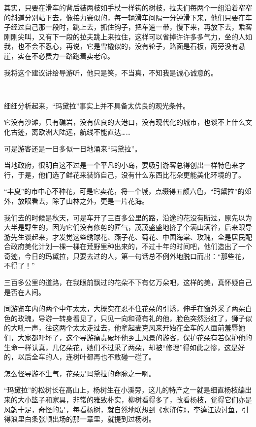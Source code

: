 \par 其实，只要在滑车的背后装两枝如手杖一样钩的树枝，拉夫们每两个一组沿着窄窄的斜道分别站下去，像接力赛似的，每一辆滑车间隔一分钟滑下来，他们只要在车子经过自己那一段时，跳上去，抓住钩子，把车速一带，慢下来，再放下去，乘客刚刚尖叫，又有下一段的拉夫跳上来拉住，这样可以省掉许许多多气力，坐的人如我，也不会不忍心，再说，它是雪橇似的，没有轮子，路面是石板，两旁没有悬崖，实在不必费力一路跑着卖老命。
\par 我将这个建议讲给导游听，他只是笑，不当真，不知我是诚心诚意的。
\par  
\par 细细分析起来，“玛黛拉”事实上并不具备太优良的观光条件。
\par 它没有沙滩，只有礁岩，没有优良的大港口，没有现代化的城市，也谈不上什么文化古迹，离欧洲大陆远，航线不能直达……
\par 可是游客还是一日多似一日地涌来“玛黛拉”。
\par 当地政府，很明白这不过是一个平凡的小岛，要吸引游客总得创出一样特色来才行，于是，他们选了鲜花来装饰自己，没有什么东西比花朵更能美化环境的了。
\par “丰夏”的市中心不种花，可是它卖花，将一个城，点缀得五颜六色，“玛黛拉”的郊外，放眼看去，除了山林之外，更是一片花海。
\par 我们去的时候是秋天，可是车开了三百多公里的路，沿途的花没有断过，原先以为大半是野生的，因为它们没有修剪的匠气，茂茂盛盛地挤了个满山满谷，后来跟导游先生谈起来，才发觉这些绣球花、燕子花、菊花、中国海棠、玫瑰，全是居民配合政府美化计划一棵一棵在荒野里种出来的，不过十年的时间吧，他们造出了一个奇迹，今日的玛黛拉，只要去过的人，第一句话总不例外地脱口而出：“那些花，不得了！”
\par 三百多公里的道路，在我眼前飘过的花朵不下有亿万朵吧，这样的美，真怀疑自己是否在人间。
\par 同游览车内的两个中年太太，大概实在忍不住花朵的引诱，伸手在窗外采了两朵白色的玫瑰，导游一转身看见了，只见一向和蔼有礼的他，脸色突然涨红了，狮子似的大吼一声，往这两个太太走过去，他拿起麦克风来开始在全车的人面前羞辱她们，大家都吓坏了，这个导游痛责破坏他乡土风景的游客，保护花朵有若保护他的生命一样认真，几亿朵花，她们不过采了两朵，却被“修理”得如此之惨，这是好的，以后全车的人，连树叶都再也不敢碰一碰了。
\par 怎么怪导游不生气，花朵是玛黛拉的命脉之一啊。
\par “玛黛拉”的松树长在高山上，杨树生在小溪旁，这儿的特产之一就是细直杨枝编出来的大小篮子和家具，非常的雅致朴实，柳树看得多了，改看杨枝，觉得它们亦是风韵十足，奇怪的是，每看杨树，就自然地联想到《水浒传》，李逵江边讨鱼，引得浪里白条张顺出场的那一章里，就提到过杨树。
